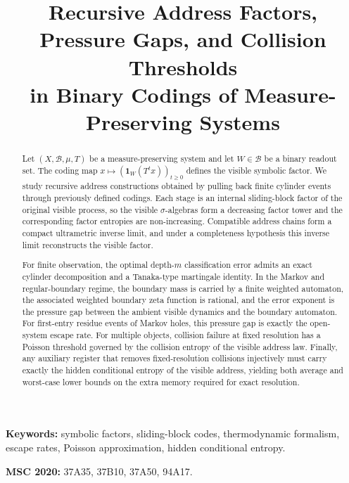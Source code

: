 \documentclass[12pt,a4paper]{article}
\title{Recursive Address Factors, Pressure Gaps, and Collision Thresholds\\
in Binary Codings of Measure-Preserving Systems}
\author{}
\date{}
\theoremstyle{plain}
\theoremstyle{definition}
\theoremstyle{remark}
\begin{document}
\maketitle

\begin{abstract}
Let $(X,\mathcal{B},\mu,T)$ be a measure-preserving system and let
$W\in\mathcal{B}$ be a binary readout set.  The coding map
$x\mapsto (\mathbf{1}_W(T^t x))_{t\geq 0}$ defines the visible symbolic
factor.  We study recursive address constructions obtained by pulling
back finite cylinder events through previously defined codings.  Each
stage is an internal sliding-block factor of the original visible
process, so the visible $\sigma$-algebras form a decreasing factor tower
and the corresponding factor entropies are non-increasing.  Compatible
address chains form a compact ultrametric inverse limit, and under a
completeness hypothesis this inverse limit reconstructs the visible
factor.

For finite observation, the optimal depth-$m$ classification error
admits an exact cylinder decomposition and a Tanaka-type martingale
identity.  In the Markov and regular-boundary regime, the boundary mass
is carried by a finite weighted automaton, the associated weighted
boundary zeta function is rational, and the error exponent is the
pressure gap between the ambient visible dynamics and the boundary
automaton.  For first-entry residue events of Markov holes, this
pressure gap is exactly the open-system escape rate.  For multiple
objects, collision failure at fixed resolution
has a Poisson threshold governed by the collision entropy of the visible
address law.  Finally, any auxiliary register that removes
fixed-resolution collisions injectively must carry exactly the hidden
conditional entropy of the visible address, yielding both average and
worst-case lower bounds on the extra memory required for exact
resolution.
\end{abstract}

{\small
\noindent\textbf{Keywords:}
symbolic factors, sliding-block codes, thermodynamic formalism, escape
rates, Poisson approximation, hidden conditional entropy.

\medskip
\noindent\textbf{MSC 2020:}
37A35, 37B10, 37A50, 94A17.
}

\bigskip












\end{document}
